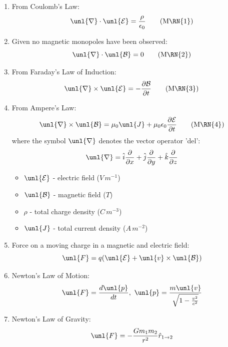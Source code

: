 \documentclass[a4paper, 11pt, normalem]{report}
\newcommand\p{\partial}
\newcommand\E{\mathcal{E}}
\newcommand\uE{\unl{\E}}
\newcommand\B{\mathcal{B}}
\newcommand\uB{\unl{\B}}
\newcommand\del{\unl{\nabla}}
\newcommand\eno{\epsilon_0}
\newcommand\hi{\hat{i}}
\newcommand\hj{\hat{j}}
\newcommand\hk{\hat{k}}
\newcommand\J{\unl{J}}
\begin{document}
\begin{enumerate}
    \item From Coulomb's Law:
        \begin{equation}
            \del\cdot\uE = \frac{\rho}{\eno} \tag{M\RN{1}}
        \end{equation}
    \item Given no magnetic monopoles have been observed:
        \begin{equation}
            \del\cdot \uB = 0 \tag{M\RN{2}}
        \end{equation}
    \item From Faraday's Law of Induction:
        \begin{equation}
            \del \times \uE = -\frac{\p \B}{\p t} \tag{M\RN{3}}
        \end{equation}
    \item From Ampere's Law:
        \begin{equation}
            \del \times \uB = \mu_0 \J + \mu_0 \eno \frac{\p \E}{\p t} \tag{M\RN{4}}
        \end{equation}
        where the symbol $\del$ denotes the vector operator 'del':
        \begin{equation}
            \del = \hi \frac{\p}{\p x} + \hj \frac{\p}{\p y} + \hk \frac{\p}{\p z}
        \end{equation}
        \begin{itemize}
            \item $\uE$ - electric field ($V\,m^{-1}$)
            \item $\uB$ - magnetic field ($T$)
            \item $\rho$ - total charge density ($C\,m^{-3}$)
            \item $\J$ - total current density ($A\,m^{-2}$)
        \end{itemize}
    \item Force on a moving charge in a magnetic and electric field:
        \begin{equation}
            \unl{F} = q(\uE + \unl{v} \times \uB)
        \end{equation}
    \item Newton's Law of Motion:
        \begin{equation}
            \unl{F} = \frac{d\unl{p}}{dt}, ~ \unl{p} = \frac{m\unl{v}}{\sqrt{1 - \frac{v^2}{c^2}}}
        \end{equation}
    \item Newton's Law of Gravity:
        \begin{equation}
            \unl{F} = -\frac{Gm_1 m_2}{r^2}\hat{r}_{1 \to 2}
        \end{equation}
\end{enumerate}
\end{document}
